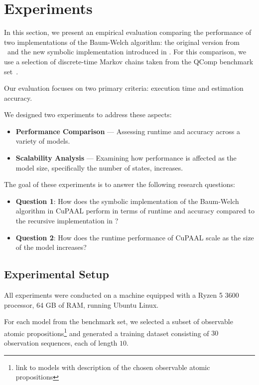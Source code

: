 \section{Experiments}\label{sec:experiments}
In this section, we present an empirical evaluation comparing the performance of two implementations of the Baum-Welch algorithm: the original version from \Jajapy\ and the new symbolic implementation introduced in \JajapyTwo.
For this comparison, we use a selection of discrete-time Markov chains taken from the QComp benchmark set~\cite{hartmanns2019quantitative}.

Our evaluation focuses on two primary criteria: execution time and estimation accuracy.

We designed two experiments to address these aspects:

\begin{itemize}
    \item \textbf{Performance Comparison} — Assessing runtime and accuracy across a variety of models.
    \item \textbf{Scalability Analysis} — Examining how performance is affected as the model size, specifically the number of states, increases.
\end{itemize}

The goal of these experiments is to answer the following research questions:

\begin{itemize}
    \item \textbf{Question 1}: How does the symbolic implementation of the Baum-Welch algorithm in CuPAAL perform in terms of runtime and accuracy compared to the recursive implementation in \Jajapy?
    \item \textbf{Question 2}: How does the runtime performance of CuPAAL scale as the size of the model increases?
\end{itemize}

\subsection{Experimental Setup}
All experiments were conducted on a machine equipped with a Ryzen 5 3600 processor, 64 GB of RAM, running Ubuntu Linux.

For each model from the benchmark set, we selected a subset of observable atomic propositions\footnote{{\color{red} link to models with description of the chosen observable atomic propositions}} and generated a training dataset consisting of $30$ observation sequences, each of length $10$.

